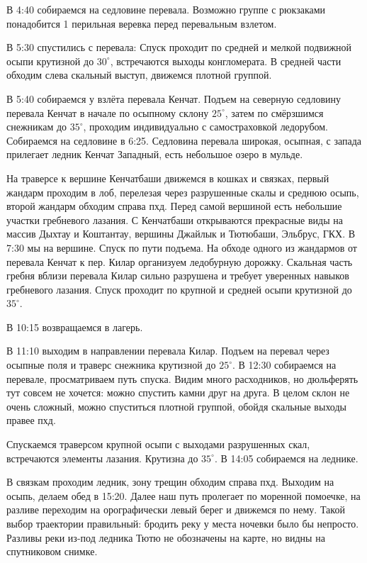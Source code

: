     В 4:40 собираемся на седловине перевала. Возможно группе с рюкзаками понадобится 1 перильная веревка перед
    перевальным взлетом.

    В 5:30 спустились с перевала: Спуск проходит по средней и мелкой подвижной осыпи крутизной до $30^\circ$,
    встречаются выходы конгломерата. В средней части обходим слева скальный выступ, движемся плотной группой.

    В 5:40 собираемся у взлёта перевала Кенчат. Подъем на северную седловину перевала Кенчат в начале по осыпному
    склону $25^\circ$, затем по смёрзшимся снежникам до $35^\circ$, проходим индивидуально с самостраховкой ледорубом.
    Собираемся на седловине в 6:25. Седловина перевала широкая, осыпная, с запада прилегает ледник Кенчат Западный,
    есть небольшое озеро в мульде.

    На траверсе к вершине Кенчатбаши движемся в кошках и связках, первый жандарм проходим в лоб, перелезая через
    разрушенные скалы и среднюю осыпь, второй жандарм обходим справа пхд. Перед самой вершиной есть небольшие
    участки гребневого лазания. С Кенчатбаши открываются прекрасные виды на массив Дыхтау и Коштантау, вершины
    Джайлык и Тютюбаши, Эльбрус, ГКХ. В 7:30 мы на вершине. Спуск по пути подъема. На обходе одного из жандармов
    от перевала Кенчат к пер. Килар организуем ледобурную дорожку. Скальная часть гребня вблизи перевала Килар
    сильно разрушена и требует уверенных навыков гребневого лазания. Спуск проходит по крупной и средней осыпи
    крутизной до $35^\circ$.

    В 10:15 возвращаемся в лагерь.

    В 11:10 выходим в направлении перевала Килар. Подъем на перевал через осыпные поля и траверс снежника крутизной
    до $25^\circ$. В 12:30 собираемся на перевале, просматриваем путь спуска. Видим много расходников, но дюльферять
    тут совсем не хочется: можно спустить камни друг на друга. В целом склон не очень сложный, можно спуститься
    плотной группой, обойдя скальные выходы правее пхд.

    Спускаемся траверсом крупной осыпи с выходами разрушенных скал, встречаются элементы лазания. Крутизна
    до $35^\circ$. В 14:05 собираемся на леднике.

    В связкам проходим ледник, зону трещин обходим справа пхд. Выходим на осыпь, делаем обед в 15:20. Далее наш путь
    пролегает по моренной помоечке, на разливе переходим на орографически левый берег и движемся по нему. Такой выбор
    траектории правильный: бродить реку у места ночевки было бы непросто. Разливы реки из-под ледника Тютю не
    обозначены на карте, но видны на спутниковом снимке.


